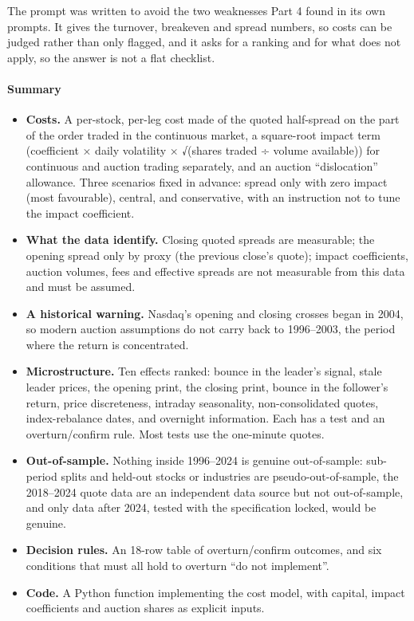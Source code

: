The prompt was written to avoid the two weaknesses Part 4 found in its own prompts. It
gives the turnover, breakeven and spread numbers, so costs can be judged rather than only
flagged, and it asks for a ranking and for what does not apply, so the answer is not a flat
checklist.

\hypertarget{summary}{%
\paragraph{Summary}\label{summary}}

\begin{itemize}
\tightlist
\item
  \textbf{Costs.} A per-stock, per-leg cost made of the quoted half-spread on the part of the
  order traded in the continuous market, a square-root impact term (coefficient ×
  daily volatility × √(shares traded ÷ volume available)) for continuous and auction
  trading separately, and an auction ``dislocation'' allowance. Three scenarios fixed in
  advance: spread only with zero impact (most favourable), central, and conservative, with
  an instruction not to tune the impact coefficient.
\item
  \textbf{What the data identify.} Closing quoted spreads are measurable; the opening spread
  only by proxy (the previous close's quote); impact coefficients, auction volumes, fees
  and effective spreads are not measurable from this data and must be assumed.
\item
  \textbf{A historical warning.} Nasdaq's opening and closing crosses began in 2004, so modern
  auction assumptions do not carry back to 1996--2003, the period where the return is
  concentrated.
\item
  \textbf{Microstructure.} Ten effects ranked: bounce in the leader's signal, stale leader
  prices, the opening print, the closing print, bounce in the follower's return, price
  discreteness, intraday seasonality, non-consolidated quotes, index-rebalance dates, and
  overnight information. Each has a test and an overturn/confirm rule. Most tests use the
  one-minute quotes.
\item
  \textbf{Out-of-sample.} Nothing inside 1996--2024 is genuine out-of-sample: sub-period splits
  and held-out stocks or industries are pseudo-out-of-sample, the 2018--2024 quote data are
  an independent data source but not out-of-sample, and only data after 2024, tested with
  the specification locked, would be genuine.
\item
  \textbf{Decision rules.} An 18-row table of overturn/confirm outcomes, and six conditions that
  must all hold to overturn ``do not implement''.
\item
  \textbf{Code.} A Python function implementing the cost model, with capital, impact
  coefficients and auction shares as explicit inputs.
\end{itemize}

